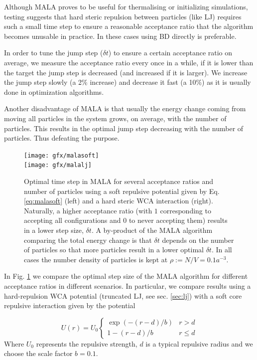 \documentclass[ twoside,openright,titlepage,numbers=noenddot,%
headinclude,footinclude,cleardoublepage=empty,abstract=on,
BCOR=5mm,paper=b5,fontsize=11pt, dvipsnames
]{scrreprt}
\newcommand{\dt}{\delta t}
\begin{document}
Although MALA proves to be useful for thermalising or initializing simulations, testing suggests that hard steric repulsion between particles (like LJ) requires such a small time step to ensure a reasonable acceptance ratio that the algorithm becomes unusable in practice. In these cases using \gls{BD} directly is preferable.

In order to tune the jump step ($\dt$) to ensure a certain acceptance ratio on average, we measure the acceptance ratio every once in a while, if it is lower than the target the jump step is decreased (and increased if it is larger). We increase the jump step slowly (a 2\% increase) and decrease it fast (a 10\%) as it is usually done in optimization algorithms.

Another disadvantage of MALA is that usually the energy change coming from moving all particles in the system grows, on average, with the number of particles. This results in the optimal jump step decreasing with the number of particles. Thus defeating the purpose.
\begin{figure}[H]
  \centering    
  \texttt{[image: gfx/malasoft]}\\
  \texttt{[image: gfx/malalj]}
  \caption{Optimal time step in MALA for several acceptance ratios and number of particles using a soft repulsive potential given by Eq. \eqref{eq:malasoft} (left) and a hard steric WCA interaction (right). Naturally, a higher acceptance ratio (with $1$ corresponding to accepting all configurations and $0$ to never accepting them) results in a lower step size, $\dt$. A by-product of the MALA algorithm comparing the total energy change is that $\dt$ depends on the number of particles so that more particles result in a lower optimal $\dt$. In all cases the number density of particles is kept at $\rho := N/V = 0.1a^{-3}$.}
  \label{fig:malastep}
\end{figure}
In Fig. \ref{fig:malastep} we compare the optimal step size of the MALA algorithm for different acceptance ratios in different scenarios. In particular, we compare results using a hard-repulsion WCA potential (truncated \gls{LJ}, see sec. \ref{sec:lj}) with a soft core repulsive interaction given by the potential

\begin{equation}
  \label{eq:malasoft}
U(r)= U_0
\begin{cases}
  \exp(-(r-d)/b) & r>d\\
  1-(r-d)/b & r\le d
\end{cases}
\end{equation}
Where $U_0$ represents the repulsive strength, $d$ is a typical repulsive radius and we choose the scale factor $b=0.1$.
\end{document}

